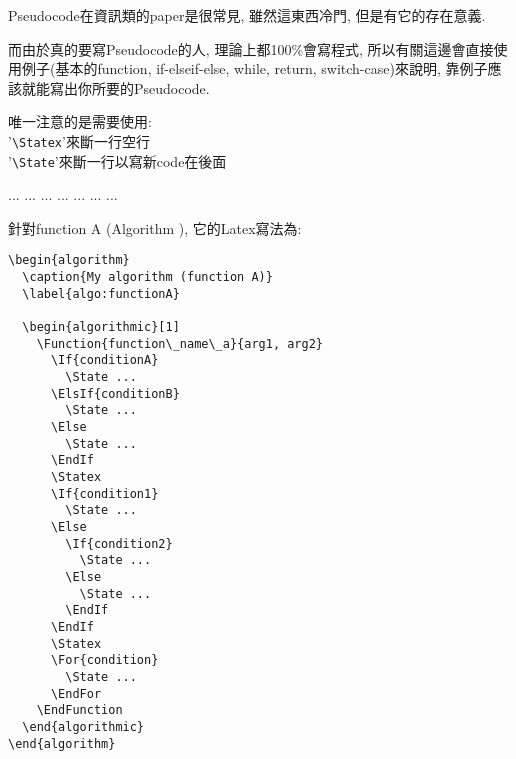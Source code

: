 

Pseudocode在資訊類的paper是很常見, 雖然這東西冷門, 但是有它的存在意義.

而由於真的要寫Pseudocode的人, 理論上都100\%會寫程式, 所以有關這邊會直接使用例子(基本的function, if-elseif-else, while, return, switch-case)來說明, 靠例子應該就能寫出你所要的Pseudocode.

唯一注意的是需要使用:\\
'\verb|\Statex|'來斷一行空行\\
'\verb|\State|'來斷一行以寫新code在後面


\newpage
\begin{algorithm}
  \caption{My algorithm (function A)}
  \label{algo:functionA}

  \begin{algorithmic}[1]
        \State ...
        \State ...
      \Else
        \State ...
      \EndIf
      \Statex
        \State ...
      \Else
          \State ...
        \Else
          \State ...
        \EndIf
      \EndIf
      \Statex
        \State ...
      \EndFor
    \EndFunction
  \end{algorithmic}
\end{algorithm}

\newpage
針對function A (Algorithm ), 它的Latex寫法為:
\begin{framed}
  \begin{verbatim}
\begin{algorithm}
  \caption{My algorithm (function A)}
  \label{algo:functionA}

  \begin{algorithmic}[1]
    \Function{function\_name\_a}{arg1, arg2}
      \If{conditionA}
        \State ...
      \ElsIf{conditionB}
        \State ...
      \Else
        \State ...
      \EndIf
      \Statex
      \If{condition1}
        \State ...
      \Else
        \If{condition2}
          \State ...
        \Else
          \State ...
        \EndIf
      \EndIf
      \Statex
      \For{condition}
        \State ...
      \EndFor
    \EndFunction
  \end{algorithmic}
\end{algorithm}
  \end{verbatim}
\end{framed}

